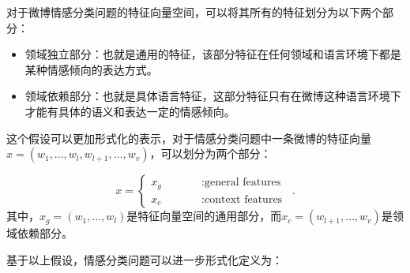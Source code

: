 \begin{hypothesis}[特征空间划分假设]
对于微博情感分类问题的特征向量空间，可以将其所有的特征划分为以下两个部分：
\begin{itemize}
\item{领域独立部分：}也就是通用的特征，该部分特征在任何领域和语言环境下都是某种情感倾向的表达方式。
\item{领域依赖部分：}也就是具体语言特征，这部分特征只有在微博这种语言环境下才能有具体的语义和表达一定的情感倾向。
\end{itemize}
\end{hypothesis}
这个假设可以更加形式化的表示，对于情感分类问题中一条微博的特征向量$ x=\left(  w_{1},\dots,w_{l},w_{l+1},\dots,w_{v} \right) $，可以划分为两个部分：

\begin{equation}
\label{e2}
x=\left\{
\begin{array}{rcl}
x_{g}     & \qquad        &:\mbox{general features}\\
x_{c}     &  \qquad       &:\mbox{context features}
\end{array}
\right. \enspace .
\end{equation}
其中，$ x_{g}= \left( w_{1},\dots,w_{l}\right) $是特征向量空间的通用部分，而$ x_{c}= \left( w_{l+1},\dots,w_{v}\right) $是领域依赖部分。

基于以上假设，情感分类问题可以进一步形式化定义为：

